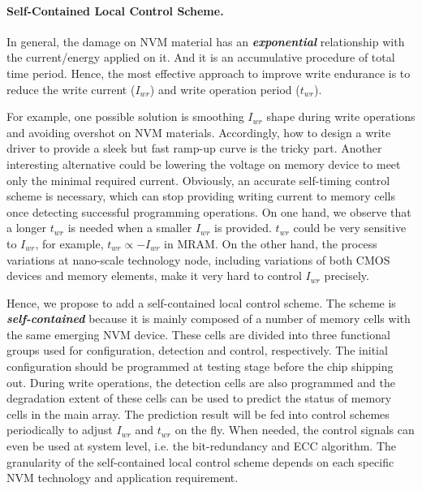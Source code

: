 \paragraph{Self-Contained Local Control Scheme.} In general, the damage on NVM material has an \textbf{\emph{exponential}} relationship with the current/energy applied on it. And it is an accumulative procedure of total time period. Hence, the most effective approach to improve write endurance is to reduce the write current ($I_{wr}$) and write operation period ($t_{wr}$).

For example, one possible solution is smoothing $I_{wr}$ shape during write operations and avoiding overshot on NVM materials. Accordingly, how to design a write driver to provide a sleek but fast ramp-up curve is the tricky part. Another interesting alternative could be lowering the voltage on memory device to meet only the minimal required current. Obviously, an accurate self-timing control scheme is necessary, which can stop providing writing current to memory cells once detecting successful programming operations. On one hand, we observe that a longer $t_{wr}$ is needed when a smaller $I_{wr}$ is provided. $t_{wr}$ could be very sensitive to $I_{wr}$, for example, $t_{wr}\propto{-I_{wr}}$ in MRAM. On the other hand, the process variations at nano-scale technology node, including variations of both CMOS devices and memory elements, make it very hard to control $I_{wr}$ precisely.

Hence, we propose to add a self-contained local control scheme. The scheme is \emph{\textbf{self-contained}} because it is mainly composed of a number of memory cells with the same emerging NVM device. These cells are divided into three functional groups used for configuration, detection and control, respectively. The initial configuration should be programmed at testing stage before the chip shipping out. During write operations, the detection cells are also programmed and the degradation extent of these cells can be used to predict the status of memory cells in the main array. The prediction result will be fed into control schemes periodically to adjust $I_{wr}$ and $t_{wr}$ on the fly. When needed, the control signals can even be used at system level, i.e. the bit-redundancy and ECC algorithm. The granularity of the self-contained local control scheme depends on each specific NVM technology and application requirement.

